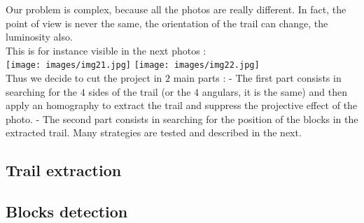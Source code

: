 \documentclass{article}
\begin{document}
Our problem is complex, because all the photos are really different. In fact, the point of view is never the same, the orientation of the trail can change, the luminosity also.\\
This is for instance visible in the next photos :\\
\texttt{[image: images/img21.jpg]} 
\texttt{[image: images/img22.jpg]}\\
Thus we decide to cut the project in $2$ main parts :
- The first part consists in searching for the $4$ sides of the trail (or the $4$ angulars, it is the same) and then apply an homography to extract the trail and suppress the projective effect of the photo.
- The second part consists in searching for the position of the blocks in the extracted trail. Many strategies are tested and described in the next.

\subsection{Trail extraction}

\subsection{Blocks detection}
\end{document}

